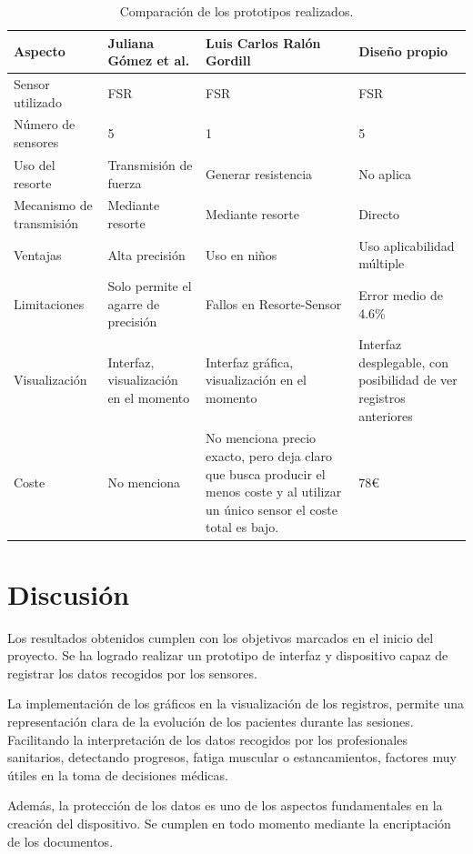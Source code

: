 \begin{table}[h]
    \begin{tabular}{|p{3cm}|p{3.5cm}|p{4cm}|p{4cm}|}
    \rowcolor[HTML]{BFBFBF} 
    \hline
    \textbf{Aspecto} & \textbf{Juliana Gómez et al.} & \textbf{Luis Carlos Ralón Gordill} & \textbf{Diseño propio} \\ \hline
    Sensor utilizado   & FSR  & FSR  & FSR \\ \hline
    Número de sensores   & 5  & 1  & 5 \\ \hline
    Uso del resorte & Transmisión de fuerza & Generar resistencia  & No aplica   \\ \hline
    Mecanismo de transmisión   & Mediante resorte  & Mediante resorte & Directo  \\ \hline
    Ventajas   & Alta precisión  & Uso en niños  & Uso aplicabilidad múltiple \\ \hline
    Limitaciones & Solo permite el agarre de precisión & Fallos en Resorte-Sensor & Error medio de 4.6\% \\ \hline
    Visualización & Interfaz, visualización en el momento & Interfaz gráfica, visualización en el momento& Interfaz desplegable, con posibilidad de ver registros anteriores \\ \hline
    Coste    & No menciona    & No menciona precio exacto, pero deja claro que busca producir el menos coste y al utilizar un único sensor el coste total es bajo. & 78€ \\ \hline
    \end{tabular}
    \caption{Comparación de los prototipos realizados.}
    \label{tab:comparacion_diseños}
\end{table}
    
\section{Discusión}

Los resultados obtenidos cumplen con los objetivos marcados en el inicio del proyecto. Se ha logrado realizar un prototipo de interfaz y dispositivo capaz de registrar los datos recogidos por los sensores.

La implementación de los gráficos en la visualización de los registros, permite una representación clara de la evolución de los pacientes durante las sesiones. Facilitando la interpretación de los datos recogidos por los profesionales sanitarios, detectando progresos,  fatiga muscular o estancamientos, factores muy útiles en la toma de decisiones médicas.

Además, la protección de los datos es uno de los aspectos fundamentales en la creación del dispositivo. Se cumplen en todo momento mediante la encriptación de los documentos.